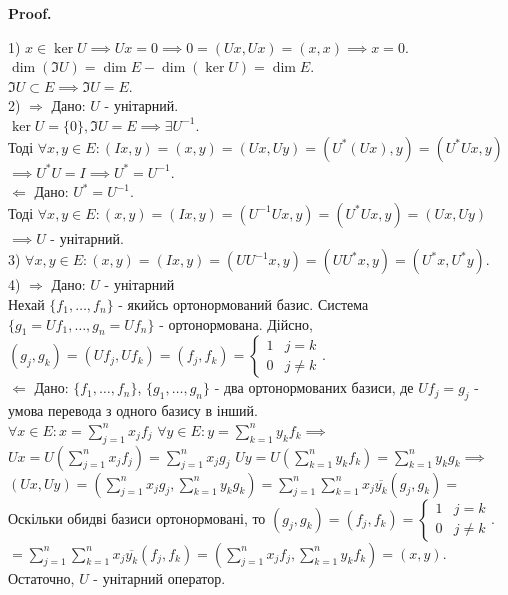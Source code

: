 \documentclass[a4paper, 10pt]{article}
\makeatletter
\def\rightproof{$\boxed{\Rightarrow}$ }
\def\leftproof{$\boxed{\Leftarrow}$ }
\theoremstyle{theoremdd}
\renewenvironment{proof}[1][Proof.\\]{\par
\pushQED{\hfill \qed}%
\normalfont \topsep6\p@\@plus6\p@\relax
\trivlist
\item\relax
{\bfseries
#1\@addpunct{.}}\hspace\labelsep\ignorespaces
}{%
\popQED\endtrivlist\@endpefalse
}
\makeatother
\begin{document}
\begin{proof}
1) $x \in \ker U \implies Ux = 0 \implies 0 = (Ux, Ux) = (x,x) \implies x = 0$.\\
$\dim(\Im U) = \dim E - \dim(\ker U) = \dim E$.\\
$\Im U \subset E \implies \Im U = E$.
\bigskip \\
\iffalse
\rm{5.7.2.} У випадку дійсного евклідового простору унітарний оператор ще називають ортогонаьним
\bigskip \\
\fi
2) \rightproof Дано: $U$ - унітарний.\\
$\ker U = \{0\}, \Im U = E \implies \exists U^{-1}$.\\
Тоді $\forall x,y \in E: (Ix,y) = (x,y) = (Ux,Uy) = (U^*(Ux), y) = (U^*Ux,y)$\\
$\implies U^* U = I \implies U^* = U^{-1}$.
\bigskip \\
\leftproof Дано: $U^* = U^{-1}$.\\
Тоді $\forall x,y \in E: (x,y) = (Ix, y) = (U^{-1}Ux, y) = (U^*Ux,y) = (Ux, Uy)$\\
$\implies U$ - унітарний.
\bigskip \\
3) $\forall x,y \in E: (x,y) = (Ix,y) = (UU^{-1}x,y) = (UU^* x,y) = (U^*x,U^*y)$.
\bigskip \\
4) \rightproof Дано: $U$ - унітарний\\
Нехай $\{f_1,\dots,f_n\}$ - якийсь ортонормований базис. Система $\{g_1 = Uf_1, \dots, g_n = Uf_n\}$ - ортонормована. Дійсно,\\
$(g_j,g_k) = (Uf_j, Uf_k) = (f_j,f_k) = \begin{cases} 1 & j = k \\ 0 & j \neq k \end{cases}$.
\bigskip \\
\leftproof Дано: $\{f_1,\dots,f_n\}$, $\{g_1,\dots,g_n\}$ - два ортонормованих базиси, де $Uf_j = g_j$ - умова перевода з одного базису в інший.\\
$\forall x \in E: x = \displaystyle \sum_{j=1}^n x_j f_j$
\hspace{2.3cm}
$\forall y \in E: y = \displaystyle \sum_{k=1}^n y_k f_k \implies$\\
$Ux = \displaystyle U\left(\sum_{j=1}^n x_j f_j \right) = \sum_{j=1}^n x_j g_j$
\hspace{0.8cm}
$Uy = \displaystyle U\left(\sum_{k=1}^n y_k f_k \right) = \sum_{k=1}^n y_k g_k \implies$\\
$\displaystyle (Ux, Uy) = \left(\sum_{j=1}^n x_j g_j, \sum_{k=1}^n y_k g_k \right) = \sum_{j=1}^n \sum_{k=1}^n x_j \overline{y_k} (g_j,g_k) \boxed{=}$\\
Оскільки обидві базиси ортонормовані, то $(g_j,g_k) = (f_j,f_k) = \begin{cases} 1 & j = k \\ 0 & j \neq k \end{cases}$.\\
$\boxed{=} \displaystyle \sum_{j=1}^n \sum_{k=1}^n x_j \overline{y_k} (f_j,f_k) = \left(\sum_{j=1}^n x_jf_j, \sum_{k=1}^n y_k f_k \right) = (x,y)$.\\
Остаточно, $U$ - унітарний оператор.
\end{proof}
\end{document}
